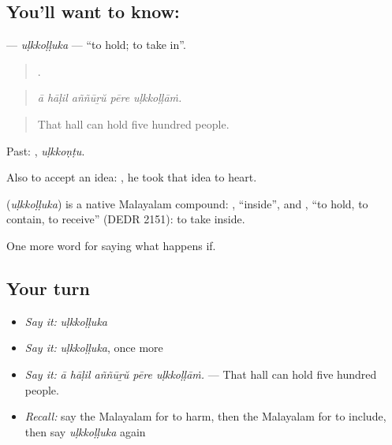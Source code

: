 \subsection*{You'll want to know: }
\textbf{} — \emph{uḷkkoḷḷuka} — \textquotedblleft{}to hold; to take in\textquotedblright{}.

\begin{quote}
    .
\end{quote}

\begin{quote}
\emph{ā hāḷil aññūṟŭ pēre uḷkkoḷḷāṁ.}
\end{quote}

\begin{quote}
That hall can hold five hundred people.
\end{quote}

Past: , \emph{uḷkkoṇṭu}.

Also to accept an idea:    , he took that idea to heart.

\begin{cousinweb}
\textbf{} (\emph{uḷkkoḷḷuka}) is a native Malayalam compound: , \textquotedblleft{}inside\textquotedblright{}, and , \textquotedblleft{}to hold, to contain, to receive\textquotedblright{} (DEDR 2151): to take inside.
\end{cousinweb}

\begin{grammarlens}[title={What you've built}]
One more word for saying what happens if.
\end{grammarlens}

\subsection*{Your turn}
\begin{itemize}
\raggedright
  \item \emph{Say it:} \emph{uḷkkoḷḷuka}
  \item \emph{Say it:} \emph{uḷkkoḷḷuka}, once more
  \item \emph{Say it:} \emph{ā hāḷil aññūṟŭ pēre uḷkkoḷḷāṁ.} — That hall can hold five hundred people.
  \item \emph{Recall:} say the Malayalam for to harm, then the Malayalam for to include, then say \emph{uḷkkoḷḷuka} again
\end{itemize}

